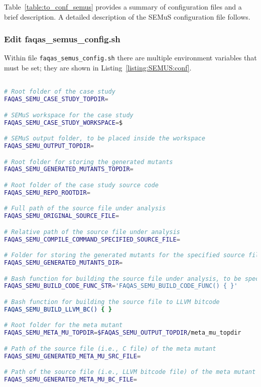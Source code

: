 

Table~\ref{table:to_conf_semus} provides a summary of \SEMUS configuration files and a brief description. A detailed description of the SEMuS configuration file follows.


\subsubsection{Edit faqas\_semus\_config.sh}

Within file \texttt{faqas\_semus\_config.sh} there are multiple environment variables that must be set; they are shown in Listing~\ref{listing:SEMUS:conf}.

\begin{lstlisting}[language=bash,label=listing:SEMUS:conf,caption=faqas\_semus\_conf.sh file.]

# Root folder of the case study
FAQAS_SEMU_CASE_STUDY_TOPDIR=

# SEMuS workspace for the case study
FAQAS_SEMU_CASE_STUDY_WORKSPACE=$

# SEMuS output folder, to be placed inside the workspace
FAQAS_SEMU_OUTPUT_TOPDIR=

# Root folder for storing the generated mutants
FAQAS_SEMU_GENERATED_MUTANTS_TOPDIR=

# Root folder of the case study source code
FAQAS_SEMU_REPO_ROOTDIR=

# Full path of the source file under analysis
FAQAS_SEMU_ORIGINAL_SOURCE_FILE=

# Relative path of the source file under analysis
FAQAS_SEMU_COMPILE_COMMAND_SPECIFIED_SOURCE_FILE=

# Folder for storing the generated mutants for the specified source file
FAQAS_SEMU_GENERATED_MUTANTS_DIR=

# Bash function for building the source file under analysis, to be specified in string format
FAQAS_SEMU_BUILD_CODE_FUNC_STR='FAQAS_SEMU_BUILD_CODE_FUNC() { }'

# Bash function for building the source file to LLVM bitcode
FAQAS_SEMU_BUILD_LLVM_BC() { }

# Root folder for the meta mutant
FAQAS_SEMU_META_MU_TOPDIR=$FAQAS_SEMU_OUTPUT_TOPDIR/meta_mu_topdir

# Path of the source file (i.e., C file) of the meta mutant
FAQAS_SEMU_GENERATED_META_MU_SRC_FILE=

# Path of the source file (i.e., LLVM bitcode file) of the meta mutant
FAQAS_SEMU_GENERATED_META_MU_BC_FILE=


\end{lstlisting}
